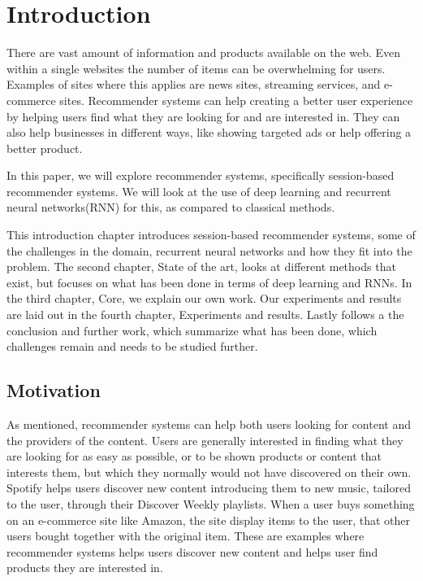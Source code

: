 \chapter{Introduction}
There are vast amount of information and products available on the web. Even within a single websites the number of items can be overwhelming for users. Examples of sites where this applies are news sites, streaming services, and e-commerce sites. Recommender systems can help creating a better user experience by helping users find what they are looking for and are interested in. They can also help businesses in different ways, like showing targeted ads or help offering a better product.

In this paper, we will explore recommender systems, specifically session-based recommender systems. We will look at the use of deep learning and recurrent neural networks(RNN) for this, as compared to classical methods.

This introduction chapter introduces session-based recommender systems, some of the challenges in the domain, recurrent neural networks and how they fit into the problem.
The second chapter, State of the art, looks at different methods that exist, but focuses on what has been done in terms of deep learning and RNNs.
In the third chapter, Core, we explain our own work.
Our experiments and results are laid out in the fourth chapter, Experiments and results.
Lastly follows a the conclusion and further work, which summarize what has been done, which challenges remain and needs to be studied further.

%


\section{Motivation}
\label{sec:motivation}

As mentioned, recommender systems can help both users looking for content and the providers of the content. Users are generally interested in finding what they are looking for as easy as possible, or to be shown products or content that interests them, but which they normally would not have discovered on their own. Spotify helps users discover new content introducing them to new music, tailored to the user, through their Discover Weekly\cite{discover-weekly} playlists. When a user buys something on an e-commerce site like Amazon, the site display items to the user, that other users bought together with the original item. These are examples where recommender systems helps users discover new content and helps user find products they are interested in.

